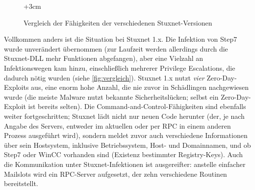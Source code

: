 \documentclass{article}
\begin{document}
\begin{figure}
  \begin{adjustwidth}{-3cm}{+3cm}
  \end{adjustwidth}
  \caption{Vergleich der Fähigkeiten der verschiedenen Stuxnet-Versionen\label{fig:vergleich}}
\end{figure}

Vollkommen anders ist die Situation bei Stuxnet 1.x.
Die Infektion von Step7 wurde unverändert übernommen (zur Laufzeit werden allerdings durch die Stuxnet-DLL mehr Funktionen abgefangen),
aber eine Vielzahl an Infektionswegen kam hinzu, einschließlich mehrerer Privilege Escalations, die dadurch nötig wurden (siehe \autoref{fig:vergleich}).
Stuxnet 1.x nutzt \emph{vier} Zero-Day-Exploits aus, eine enorm hohe Anzahl, die nie zuvor in Schädlingen nachgewiesen wurde
(die meiste Malware nutzt bekannte Sicherheitslücken; selbst ein Zero-Day-Exploit ist bereits selten).
Die Command-and-Control-Fähigkeiten sind ebenfalls weiter fortgeschritten;
Stuxnet lädt nicht nur neuen Code herunter (der, je nach Angabe des Servers, entweder im aktuellen oder per RPC in einem anderen Prozess ausgeführt wird),
sondern meldet zuvor auch verschiedene Informationen über sein Hostsystem,
inklusive Betriebssystem, Host- und Domainnamen, und ob Step7 oder WinCC vorhanden sind (Existenz bestimmter Registry-Keys).
Auch die Kommunikation unter Stuxnet-Infektionen ist ausgereifter:
anstelle einfacher Mailslots wird ein RPC-Server aufgesetzt, der zehn verschiedene Routinen bereitstellt. %
\end{document}
